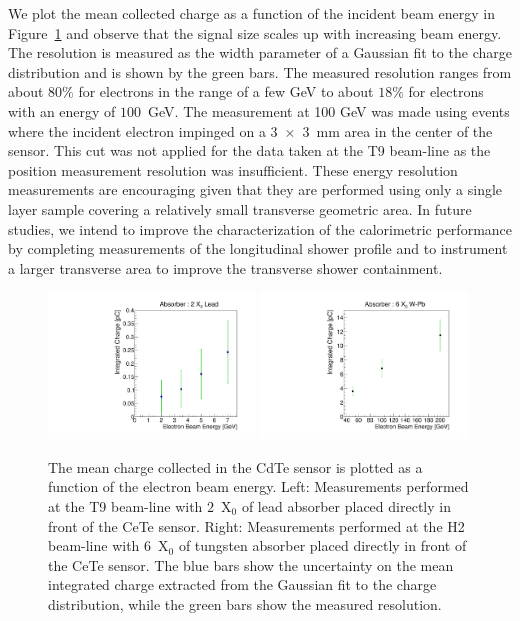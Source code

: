 We plot the mean collected charge as a function of the incident beam energy
in Figure~\ref{fig:ChargeVsEnergy} and observe that the signal size scales
up with increasing beam energy. The resolution is measured as the width
parameter of a Gaussian fit to the charge distribution and is shown by the green bars. 
The measured resolution ranges from
about $80\%$ for electrons in the range of a few GeV to 
about $18\%$ for electrons with an energy of $100$~GeV.
The measurement at 100 GeV was made using events where the incident electron impinged on
a 3~$\times$~3~mm area in the center of the sensor. 
%         
%
This cut was not applied for the data taken at the T9 beam-line 
as the position measurement resolution was insufficient.
These energy resolution measurements are encouraging given that they are performed
using only a single layer sample covering a relatively small transverse
geometric area. In future studies, we intend to improve the characterization
of the calorimetric performance by completing measurements of the
longitudinal shower profile and to instrument a larger transverse 
area to improve the transverse shower containment. 

\begin{figure}[htbp] 
\centering
\includegraphics[width=0.49\textwidth]{figures/ChargeVsEnergyAt2X0.pdf} 
\includegraphics[width=0.49\textwidth]{figures/ChargeVsEnergyAt6X0.pdf} 
\caption{ The mean charge collected in the CdTe sensor is plotted as a function
of the electron beam energy. Left: Measurements performed at the T9 beam-line
with $2$~$\mathrm{X}_{0}$ of lead absorber placed directly in front of the 
CeTe sensor. Right: Measurements performed at the H2 beam-line
with $6$~$\mathrm{X}_{0}$ of tungsten absorber placed directly in front of the 
CeTe sensor. The blue bars show the uncertainty on the mean integrated charge
extracted from the Gaussian fit to the charge distribution, while the green 
bars show the measured resolution. } 
\label{fig:ChargeVsEnergy} 
\end{figure} 


